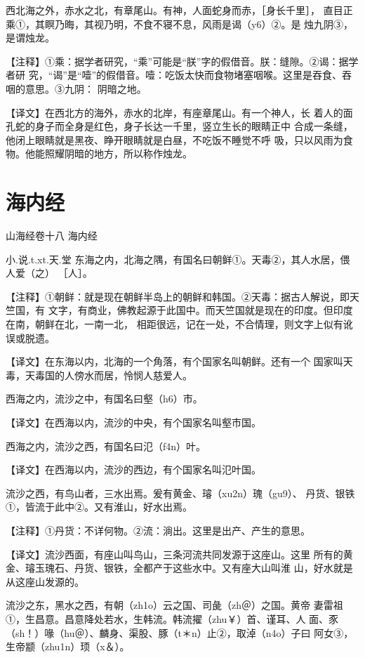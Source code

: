 \documentclass[a4paper,12pt,UTF8,twoside]{ctexbook}
\begin{document}
西北海之外，赤水之北，有章尾山。有神，人面蛇身而赤，［身长千里］， 直目正乘①，其瞑乃晦，其视乃明，不食不寝不息，风雨是谒（y6）②。是 烛九阴③，是谓烛龙。

【注释】①乘：据学者研究，“乘”可能是“朕”字的假借音。朕：缝隙。②谒：据学者研 究，“谒”是“噎”的假借音。噎：吃饭太快而食物堵塞咽喉。这里是吞食、吞咽的意思。③九阴： 阴暗之地。

【译文】在西北方的海外，赤水的北岸，有座章尾山。有一个神人，长 着人的面孔蛇的身子而全身是红色，身子长达一千里，竖立生长的眼睛正中 合成一条缝，他闭上眼睛就是黑夜、睁开眼睛就是白昼，不吃饭不睡觉不呼 吸，只以风雨为食物。他能照耀阴暗的地方，所以称作烛龙。

\chapter{海内经}

山海经卷十八 海内经

小.说.t.xt.天.堂
东海之内，北海之隅，有国名曰朝鲜①。天毒②，其人水居，偎人爱（之） ［人］。

【注释】①朝鲜：就是现在朝鲜半岛上的朝鲜和韩国。②天毒：据古人解说，即天竺国，有 文字，有商业，佛教起源于此国中。而天竺国就是现在的印度。但印度在南，朝鲜在北，一南一北， 相距很远，记在一处，不合情理，则文字上似有讹误或脱遗。

【译文】在东海以内，北海的一个角落，有个国家名叫朝鲜。还有一个 国家叫天毒，天毒国的人傍水而居，怜悯人慈爱人。

西海之内，流沙之中，有国名曰壑（h6）市。

【译文】在西海以内，流沙的中央，有个国家名叫壑市国。

西海之内，流沙之西，有国名曰氾（f4n）叶。

【译文】在西海以内，流沙的西边，有个国家名叫氾叶国。

流沙之西，有鸟山者，三水出焉。爰有黄金、璿（xu2n）瑰（gu9）、 丹货、银铁①，皆流于此中②。又有淮山，好水出焉。

【注释】①丹货：不详何物。②流：淌出。这里是出产、产生的意思。

【译文】流沙西面，有座山叫鸟山，三条河流共同发源于这座山。这里 所有的黄金、璿玉瑰石、丹货、银铁，全都产于这些水中。又有座大山叫淮 山，好水就是从这座山发源的。

流沙之东，黑水之西，有朝（zh1o）云之国、司彘（zh＠）之国。黄帝 妻雷祖①，生昌意。昌意降处若水，生韩流。韩流擢（zhu￥）首、谨耳、人 面、豕（sh！）喙（hu＠）、麟身、渠股、豚（t＊n）止②，取淖（n4o）子曰 阿女③，生帝颛（zhu1n）顼（x＆）。
\end{document}
